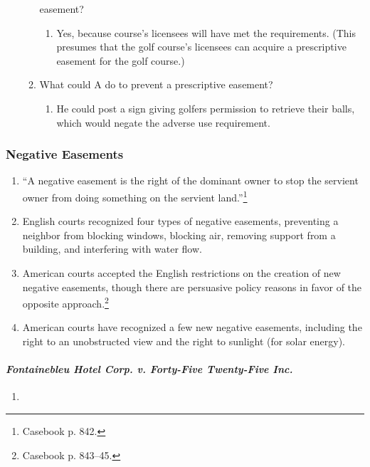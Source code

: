 \begin{enumerate}
\begin{enumerate}
        easement?
        \begin{enumerate}
            \item Yes, because course's licensees will have met the 
            requirements. (This presumes that the golf course's licensees can 
            acquire a prescriptive easement for the golf course.)
        \end{enumerate}
        \item What could A do to prevent a prescriptive easement?
        \begin{enumerate}
            \item He could post a sign giving golfers permission to retrieve 
            their balls, which would negate the adverse use requirement. 
      \end{enumerate}
    \end{enumerate}
\end{enumerate}

\subsubsection{Negative Easements}

\begin{enumerate}
    \item ``A negative easement is the right of the dominant owner to stop the 
    servient owner from doing something on the servient 
    land.''\footnote{Casebook p. 842.}
    \item English courts recognized four types of negative easements, 
    preventing a neighbor from blocking windows, blocking air, removing 
    support from a building, and interfering with water flow.
    \item American courts accepted the English restrictions on the creation of 
    new negative easements, though there are persuasive policy reasons in 
    favor of the opposite approach.\footnote{Casebook p. 843--45.}
    \item American courts have recognized a few new negative easements, 
    including the right to an unobstructed view and the right to sunlight (for 
    solar energy).
\end{enumerate}

\paragraph{\emph{Fontainebleu Hotel Corp. v. Forty-Five Twenty-Five Inc.}}

\begin{enumerate}
    \item %
\end{enumerate}

